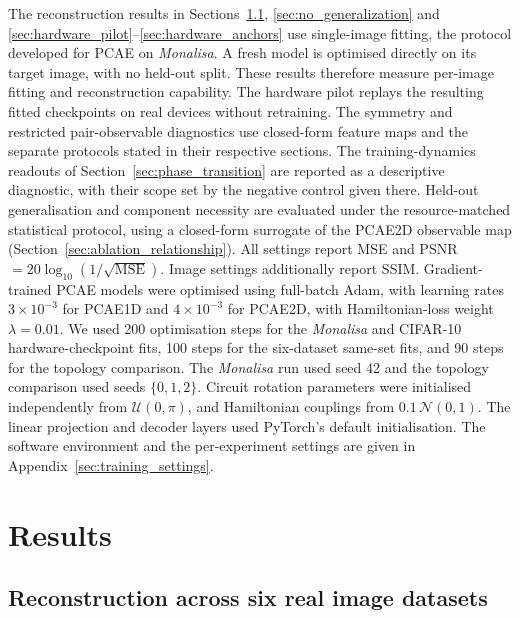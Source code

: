 \documentclass[pdflatex,sn-basic]{sn-jnl}
\begin{document}
The reconstruction results in Sections~\ref{sec:sameset_results}, \ref{sec:no_generalization} and \ref{sec:hardware_pilot}--\ref{sec:hardware_anchors} use single-image fitting, the protocol developed for PCAE on \textit{Monalisa}.
A fresh model is optimised directly on its target image, with no held-out split.
These results therefore measure per-image fitting and reconstruction capability.
The hardware pilot replays the resulting fitted checkpoints on real devices without retraining.
The symmetry and restricted pair-observable diagnostics use closed-form feature maps and the separate protocols stated in their respective sections.
The training-dynamics readouts of Section~\ref{sec:phase_transition} are reported as a descriptive diagnostic, with their scope set by the negative control given there.
Held-out generalisation and component necessity are evaluated under the resource-matched statistical protocol, using a closed-form surrogate of the PCAE2D observable map (Section~\ref{sec:ablation_relationship}).
All settings report MSE and PSNR $=20\log_{10}(1/\sqrt{\mathrm{MSE}})$.
Image settings additionally report SSIM.
Gradient-trained PCAE models were optimised using full-batch Adam, with learning rates $3\times10^{-3}$ for PCAE1D and $4\times10^{-3}$ for PCAE2D, with Hamiltonian-loss weight $\lambda=0.01$.
We used 200 optimisation steps for the \textit{Monalisa} and CIFAR-10 hardware-checkpoint fits, 100 steps for the six-dataset same-set fits, and 90 steps for the topology comparison.
The \textit{Monalisa} run used seed 42 and the topology comparison used seeds $\{0,1,2\}$.
Circuit rotation parameters were initialised independently from $\mathcal U(0,\pi)$, and Hamiltonian couplings from $0.1\,\mathcal N(0,1)$.
The linear projection and decoder layers used PyTorch's default initialisation.
The software environment and the per-experiment settings are given in Appendix~\ref{sec:training_settings}.

\section{Results}
\label{sec:results}

\subsection{Reconstruction across six real image datasets}
\label{sec:sameset_results}
\end{document}
